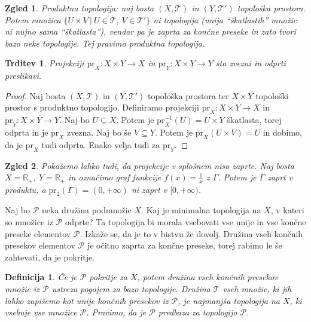\documentclass[10pt, a4paper]{article}
\newtheorem{trditev}[izr]{Trditev}
\newtheorem{defi}{Definicija}[section]
\newenvironment{noticeB}{%
  \tcolorbox[%
  notitle,
  empty,
  enhanced,  %
  breakable,
  coltext=black,
  colback=white, 
  fontupper=\rmfamily,
  parbox=false,
  noparskip,
  sharp corners,
  boxrule=-1pt,  %
  frame hidden,
  left=7pt,  %
  right=7pt,
  top=5pt,
  bottom=5pt,
  before skip=2.5ex plus 2pt,
  after skip=2.5ex plus 2pt,
  borderline west = {1.5pt}{-0.1pt}{blue!30!black}, %
  overlay unbroken and last={%
    \draw[color=black, line width=1.25pt]
    ($(frame.south west)+(1.pt, -0.1pt)$) -- ++(2em, 0);
  }
  ]}
{\endtcolorbox}
\newenvironment{definicija}{\begin{defi}\begin{noticeB}}{%
    \end{noticeB}\end{defi}}
\newtheorem{zgled}{Zgled}[section]
\newenvironment{noticeC}{%
  \tcolorbox[%
  notitle,
  empty,
  enhanced,  %
  breakable,
  coltext=black, 
  fontupper=\rmfamily,
  parbox=false,
  noparskip,
  sharp corners,
  boxrule=-1pt,  %
  frame hidden,
  left=7pt,  %
  right=7pt,
  top=5pt,
  bottom=5pt,
  before skip=2.5ex plus 2pt,
  after skip=2.5ex plus 2pt,
  overlay unbroken and last={%
  },
  ]}
{\endtcolorbox}
\newenvironment{dokaz}%
  {\begin{noticeC}\begin{proof}}%
  {\end{proof}\end{noticeC}}
\newcommand{\R}{\mathbb {R}}
\newcommand{\topo}[1]{\mathcal{#1}}
\begin{document}
\begin{zgled}
  Produktna topologija: naj bosta $(X, \mathcal{T})$ in $(Y, \mathcal{T}')$ topološka prostora.
  Potem množica $\{U \times V\ |\ U \in \mathcal{T},\ V \in \mathcal{T}'\}$ ni topologija (unija "`škatlastih"' množic ni nujno sama "`škatlasta"'),
  vendar pa je zaprta za končne preseke in zato tvori bazo neke topologije.
  Tej pravimo produktna topologija.
\end{zgled}

\begin{trditev}
  Projekciji $\mathrm{pr}_X: X \times Y \to X$ in $\mathrm{pr}_Y : X \times Y \to Y$ sta zvezni in odprti preslikavi.
\end{trditev}

\begin{dokaz}
  Naj bosta $(X, \mathcal{T})$ in $(Y, \mathcal{T}')$
  topološka prostora ter $X \times Y$ topološki prostor s produktno topologijo. Definiramo projekciji $\mathrm{pr}_X : X \times Y \to X$ in $\mathrm{pr}_Y : X \times Y \to Y$.
  Naj bo $U \subseteq X$. Potem je $\mathrm{pr}_X ^{-1} (U) = U \times Y$ škatlasta, torej odprta in je $\mathrm{pr}_X$ zvezna.
  Naj bo še $V \subseteq Y$. Potem je $\mathrm{pr}_X (U \times V) = U$ in dobimo, da je $\mathrm{pr}_X$ tudi odprta.
  Enako velja tudi za $\mathrm{pr}_Y$.
\end{dokaz}

\begin{zgled}
  Pokažemo lahko tudi, da projekcije v splošnem niso zaprte.
  Naj bosta $X = \R_+$, $Y = \R_+$ in označimo graf funkcije $f(x) = \frac{1}{x}$ z $\Gamma$.
  Potem je $\Gamma$ zaprt v produktu, a $\mathrm{pr}_2 (\Gamma) = (0, +\infty)$ ni zaprt v $[0, +\infty)$.
\end{zgled}

Naj bo $\mathcal{P}$ neka družina podmnožic $X$.
Kaj je minimalna topologija na $X$, v kateri so množice iz $\mathcal{P}$ odprte?
Ta topologija bi morala vsebovati vse unije in vse končne preseke elementov $\mathcal{P}$.
Izkaže se, da je to v bistvu že dovolj. Družina vseh končnih presekov elementov $\mathcal{P}$
je očitno zaprta za končne preseke, torej rabimo le še zahtevati, da je pokritje.

\begin{definicija}
  Če je $\topo{P}$ pokritje za $X$, potem družina vseh končnih presekov množic iz $\mathcal{P}$
  ustreza pogojem za bazo topologije. Družina $\mathcal{T}$ vseh množic, ki jih lahko zapišemo kot unije končnih presekov
  iz $\topo{P}$, je najmanjša topologija na $X$, ki vsebuje vse množice $\topo{P}$.
  Pravimo, da je $\topo{P}$ predbaza za topologijo $\topo{P}$.
\end{definicija}
\end{document}
